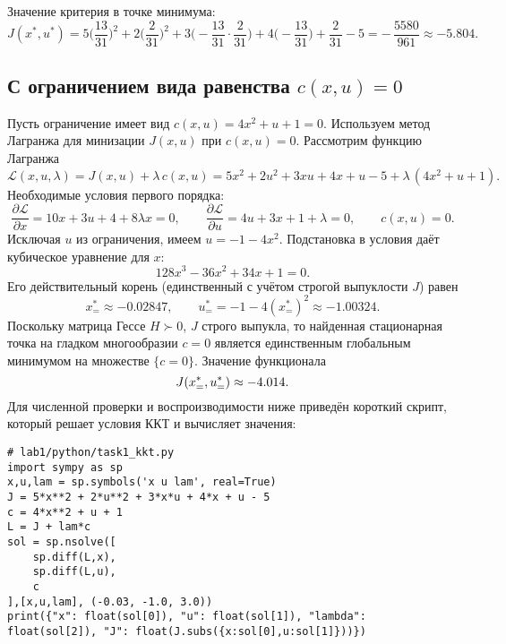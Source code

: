 Значение критерия в точке минимума:
\[
J(x^{\ast},u^{\ast})=5\Big(\frac{13}{31}\Big)^2+2\Big(\frac{2}{31}\Big)^2+3\Big(-\frac{13}{31}\cdot\frac{2}{31}\Big)+4\Big(-\frac{13}{31}\Big)+\frac{2}{31}-5
= -\,\frac{5580}{961}\approx -5.804.
\]


\subsection{С ограничением вида равенства \(c(x,u)=0\)}
Пусть ограничение имеет вид \(c(x,u)=4x^2+u+1=0\). Используем метод Лагранжа для минизации \(J(x,u)\) при \(c(x,u)=0\). Рассмотрим функцию Лагранжа
\[
\mathcal{L}(x,u,\lambda)=J(x,u)+\lambda\,c(x,u)=5x^2+2u^2+3xu+4x+u-5+\lambda\,(4x^2+u+1).
\]
Необходимые условия первого порядка:
\[
\frac{\partial \mathcal{L}}{\partial x}=10x+3u+4+8\lambda x=0,\qquad
\frac{\partial \mathcal{L}}{\partial u}=4u+3x+1+\lambda=0,\qquad
c(x,u)=0.
\]
Исключая \(u\) из ограничения, имеем \(u=-1-4x^2\). Подстановка в условия даёт кубическое уравнение для \(x\):
\[
128x^3-36x^2+34x+1=0.
\]
Его действительный корень (единственный с учётом строгой выпуклости \(J\)) равен
\[
 x^{\ast}_{=}\approx -0.02847,\qquad u^{\ast}_{=}= -1-4(x^{\ast}_{=})^2\approx -1.00324.
\]
Поскольку матрица Гессе \(H\succ0\), \(J\) строго выпукла, то найденная стационарная точка на гладком многообразии \(c=0\) является единственным глобальным минимумом на множестве \(\{c=0\}\). Значение функционала
\[\small
J(x^{\ast}_{=},u^{\ast}_{=})\approx -4.014.
\]
Для численной проверки и воспроизводимости ниже приведён короткий скрипт, который решает условия ККТ и вычисляет значения:

\begin{lstlisting}[caption={Решение условий ККТ для равенства и проверка},label={lst:kkt}]
# lab1/python/task1_kkt.py
import sympy as sp
x,u,lam = sp.symbols('x u lam', real=True)
J = 5*x**2 + 2*u**2 + 3*x*u + 4*x + u - 5
c = 4*x**2 + u + 1
L = J + lam*c
sol = sp.nsolve([
    sp.diff(L,x),
    sp.diff(L,u),
    c
],[x,u,lam], (-0.03, -1.0, 3.0))
print({"x": float(sol[0]), "u": float(sol[1]), "lambda": float(sol[2]), "J": float(J.subs({x:sol[0],u:sol[1]}))})
\end{lstlisting}

